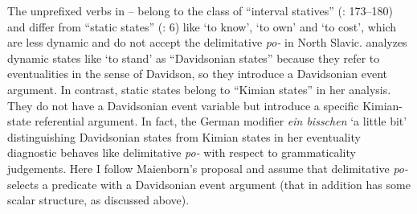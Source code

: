 \documentclass[output=paper,colorlinks,citecolor=brown]{langscibook}
\begin{document}




\noindent The unprefixed verbs in -- belong to the class of “interval statives” (\citealt{Dowty1979}: 173--180) and differ from “static states” (\citealt{Bach1986}: 6) like ‘to know’, ‘to own’ and ‘to cost’, which are less dynamic and do not accept the delimitative \textit{po-} in North Slavic. \citet{Maienborn2003, Maienborn2005} analyzes dynamic states like ‘to stand’ as “Davidsonian states” because they refer to eventualities in the sense of Davidson, so they introduce a Davidsonian event argument. In contrast, static states belong to “Kimian states” in her analysis. They do not have a Davidsonian event variable but introduce a specific Kimian-state referential argument. In fact, the German modifier \textit{ein bisschen} ‘a little bit’ distinguishing Davidsonian states from Kimian states in her eventuality diagnostic \citep[297--299]{Maienborn2005} behaves like delimitative \textit{po-} with respect to grammaticality judgements. Here I follow Maienborn’s proposal and assume that delimitative \textit{po-} selects a predicate with a Davidsonian event argument (that in addition has some scalar structure, as discussed above). 
\end{document}
